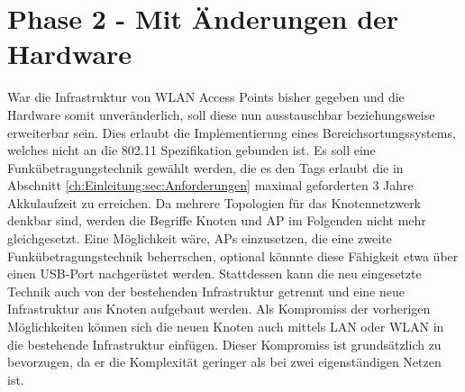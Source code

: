 \chapter{Phase 2 - Mit Änderungen der Hardware}
\label{ch:phase2}
War die Infrastruktur von WLAN Access Points bisher gegeben und die Hardware somit unveränderlich, soll diese nun ausstauschbar beziehungsweise erweiterbar sein.
Dies erlaubt die Implementierung eines Bereichsortungssystems, welches nicht an die 802.11 Spezifikation gebunden ist.
Es soll eine Funkübetragungstechnik gewählt werden, die es den Tags erlaubt die in Abschnitt \ref{ch:Einleitung:sec:Anforderungen} maximal geforderten 3 Jahre Akkulaufzeit zu erreichen.
Da mehrere Topologien für das Knotennetzwerk denkbar sind, werden die Begriffe Knoten und AP im Folgenden nicht mehr gleichgesetzt.
Eine Möglichkeit wäre, APs einzusetzen, die eine zweite Funkübetragungstechnik beherrschen, optional könnnte diese Fähigkeit etwa über einen USB-Port nachgerüstet werden.
Stattdessen kann die neu eingesetzte Technik auch von der bestehenden Infrastruktur getrennt und eine neue Infrastruktur aus Knoten aufgebaut werden.
Als Kompromiss der vorherigen Möglichkeiten können sich die neuen Knoten auch mittels LAN oder WLAN in die bestehende Infrastruktur einfügen. 
Dieser Kompromiss ist grundsätzlich zu bevorzugen, da er die Komplexität geringer als bei zwei eigenständigen Netzen ist.


